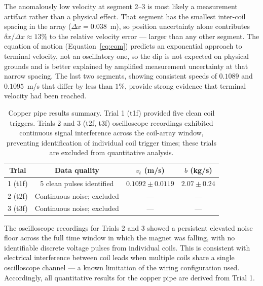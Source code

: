 \documentclass[11pt]{article}
\begin{document}
The anomalously low velocity at segment 2--3 is most likely a measurement artifact rather
than a physical effect. That segment has the smallest inter-coil spacing in the array
($\Delta x = 0.038$~m), so position uncertainty alone contributes
$\delta x / \Delta x \approx 13\%$ to the relative velocity error --- larger than any other
segment. The equation of motion (Equation~\ref{eq:eom}) predicts an exponential approach to
terminal velocity, not an oscillatory one, so the dip is not expected on physical grounds
and is better explained by amplified measurement uncertainty at that narrow spacing. The last
two segments, showing consistent speeds of $0.1089$ and $0.1095$~m/s that differ by less
than $1\%$, provide strong evidence that terminal velocity had been reached.

\begin{table}[H]
\centering
\caption{Copper pipe results summary. Trial 1 (t1f) provided five clean coil triggers.
Trials 2 and 3 (t2f, t3f) oscilloscope recordings exhibited continuous signal interference
across the coil-array window, preventing identification of individual coil trigger times;
these trials are excluded from quantitative analysis.}
\label{tab:copper_summary}
\begin{tabular}{cccc}
\toprule
Trial & Data quality & $v_t$ (m/s) & $b$ (kg/s) \\
\midrule
1 (t1f) & 5 clean pulses identified & $0.1092 \pm 0.0119$ & $2.07 \pm 0.24$ \\
2 (t2f) & Continuous noise; excluded & --- & --- \\
3 (t3f) & Continuous noise; excluded & --- & --- \\
\bottomrule
\end{tabular}
\end{table}

The oscilloscope recordings for Trials 2 and 3 showed a persistent elevated noise floor
across the full time window in which the magnet was falling, with no identifiable discrete
voltage pulses from individual coils. This is consistent with electrical interference between
coil leads when multiple coils share a single oscilloscope channel — a known limitation of
the wiring configuration used. Accordingly, all quantitative results for the copper pipe are
derived from Trial 1.

\end{document}
